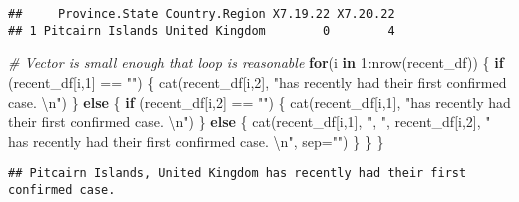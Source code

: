 \documentclass[
]{article}
\newenvironment{Shaded}{\begin{snugshade}}{\end{snugshade}}
\newcommand{\AttributeTok}[1]{\textcolor[rgb]{0.77,0.63,0.00}{#1}}
\newcommand{\CommentTok}[1]{\textcolor[rgb]{0.56,0.35,0.01}{\textit{#1}}}
\newcommand{\ControlFlowTok}[1]{\textcolor[rgb]{0.13,0.29,0.53}{\textbf{#1}}}
\newcommand{\DecValTok}[1]{\textcolor[rgb]{0.00,0.00,0.81}{#1}}
\newcommand{\DocumentationTok}[1]{\textcolor[rgb]{0.56,0.35,0.01}{\textbf{\textit{#1}}}}
\newcommand{\FloatTok}[1]{\textcolor[rgb]{0.00,0.00,0.81}{#1}}
\newcommand{\FunctionTok}[1]{\textcolor[rgb]{0.00,0.00,0.00}{#1}}
\newcommand{\NormalTok}[1]{#1}
\newcommand{\OtherTok}[1]{\textcolor[rgb]{0.56,0.35,0.01}{#1}}
\newcommand{\SpecialCharTok}[1]{\textcolor[rgb]{0.00,0.00,0.00}{#1}}
\newcommand{\StringTok}[1]{\textcolor[rgb]{0.31,0.60,0.02}{#1}}
\begin{document}
\begin{verbatim}
##     Province.State Country.Region X7.19.22 X7.20.22
## 1 Pitcairn Islands United Kingdom        0        4
\end{verbatim}

\begin{Shaded}
\begin{Highlighting}[]
\CommentTok{\# Vector is small enough that loop is reasonable}
\ControlFlowTok{for}\NormalTok{(i }\ControlFlowTok{in} \DecValTok{1}\SpecialCharTok{:}\FunctionTok{nrow}\NormalTok{(recent\_df))}
\NormalTok{\{}
  \ControlFlowTok{if}\NormalTok{ (recent\_df[i,}\DecValTok{1}\NormalTok{] }\SpecialCharTok{==} \StringTok{""}\NormalTok{) \{}
    \FunctionTok{cat}\NormalTok{(recent\_df[i,}\DecValTok{2}\NormalTok{], }\StringTok{"has recently had their first confirmed case. }\SpecialCharTok{\textbackslash{}n}\StringTok{"}\NormalTok{)}
\NormalTok{  \} }\ControlFlowTok{else}\NormalTok{ \{}
    \ControlFlowTok{if}\NormalTok{ (recent\_df[i,}\DecValTok{2}\NormalTok{] }\SpecialCharTok{==} \StringTok{""}\NormalTok{) \{}
      \FunctionTok{cat}\NormalTok{(recent\_df[i,}\DecValTok{1}\NormalTok{], }\StringTok{"has recently had their first confirmed case. }\SpecialCharTok{\textbackslash{}n}\StringTok{"}\NormalTok{)}
\NormalTok{    \} }\ControlFlowTok{else}\NormalTok{ \{}
      \FunctionTok{cat}\NormalTok{(recent\_df[i,}\DecValTok{1}\NormalTok{], }\StringTok{", "}\NormalTok{, recent\_df[i,}\DecValTok{2}\NormalTok{], }
          \StringTok{" has recently had their first confirmed case. }\SpecialCharTok{\textbackslash{}n}\StringTok{"}\NormalTok{, }\AttributeTok{sep=}\StringTok{""}\NormalTok{)}
\NormalTok{    \}}
\NormalTok{  \}}
\NormalTok{\}}
\end{Highlighting}
\end{Shaded}

\begin{verbatim}
## Pitcairn Islands, United Kingdom has recently had their first confirmed case.
\end{verbatim}

\begin{Shaded}
\end{Shaded}
\end{document}
